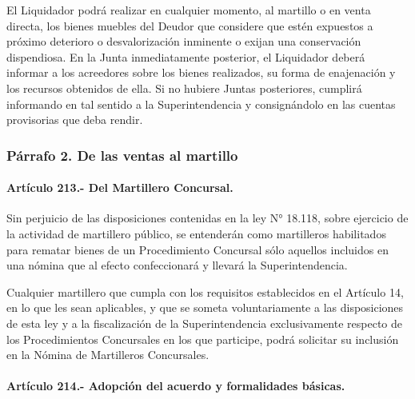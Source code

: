 \documentclass[
]{book}
\begin{document}
El Liquidador podrá realizar en cualquier momento, al martillo o en venta directa, los bienes muebles del Deudor que considere que estén expuestos a próximo deterioro o desvalorización inminente o exijan una conservación dispendiosa. En la Junta inmediatamente posterior, el Liquidador deberá informar a los acreedores sobre los bienes realizados, su forma de enajenación y los recursos obtenidos de ella. Si no hubiere Juntas posteriores, cumplirá informando en tal sentido a la Superintendencia y consignándolo en las cuentas provisorias que deba rendir.

\hypertarget{puxe1rrafo-2.-de-las-ventas-al-martillo}{%
\subsubsection*{Párrafo 2. De las ventas al martillo}\label{puxe1rrafo-2.-de-las-ventas-al-martillo}}

\hypertarget{artuxedculo-213.--del-martillero-concursal.}{%
\paragraph*{Artículo 213.- Del Martillero Concursal.}\label{artuxedculo-213.--del-martillero-concursal.}}

Sin perjuicio de las disposiciones contenidas en la ley N° 18.118, sobre ejercicio de la actividad de martillero público, se entenderán como martilleros habilitados para rematar bienes de un Procedimiento Concursal sólo aquellos incluidos en una nómina que al efecto confeccionará y llevará la Superintendencia.

Cualquier martillero que cumpla con los requisitos establecidos en el Artículo 14, en lo que les sean aplicables, y que se someta voluntariamente a las disposiciones de esta ley y a la fiscalización de la Superintendencia exclusivamente respecto de los Procedimientos Concursales en los que participe, podrá solicitar su inclusión en la Nómina de Martilleros Concursales.

\hypertarget{artuxedculo-214.--adopciuxf3n-del-acuerdo-y-formalidades-buxe1sicas.}{%
\paragraph*{Artículo 214.- Adopción del acuerdo y formalidades básicas.}\label{artuxedculo-214.--adopciuxf3n-del-acuerdo-y-formalidades-buxe1sicas.}}
\end{document}
